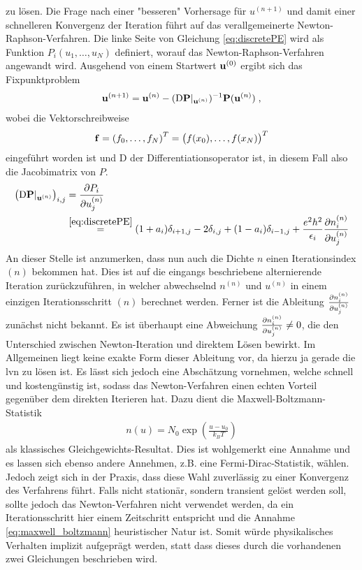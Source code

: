 zu lösen. Die Frage nach einer "besseren" Vorhersage für $u^{(n+1)}$ und damit einer schnelleren Konvergenz der Iteration führt auf das verallgemeinerte Newton-Raphson-Verfahren.
Die linke Seite von Gleichung \eqref{eq:discretePE} wird als Funktion $P_i(u_1,\dots,u_N)$ definiert, worauf das Newton-Raphson-Verfahren angewandt wird. Ausgehend von einem Startwert $\vb{u}^{(0)}$ ergibt sich das Fixpunktproblem
\begin{align}
  \vb{u}^{(n+1)} = \vb{u}^{(n)} - (\mathrm{D}\vb{P}|_{\vb{u}^{(n)}})^{-1} \vb{P}(\vb{u}^{(n)}) \; ,
  \label{eq:fixpunkt_gummel}
\end{align}
wobei die Vektorschreibweise
\begin{align*}
  \vb{f} = \left( f_0,\dots,f_N\right)^T = \left( f(x_0),\dots,f(x_N)\right)^T
\end{align*}
eingeführt worden ist und $\mathrm{D}$ der Differentiationsoperator ist, in diesem Fall also die Jacobimatrix von $P$.
\begin{align*}
  \left(\mathrm{D}\vb{P}|_{\vb{u}^{(n)}}\right)_{i,j} &= \frac{\mathrm{\partial}P_i}{\mathrm{\partial}u_j^{(n)}} \\ &\stackrel{\eqref{eq:discretePE}}{=}
  (1+a_i)\delta_{i+1,j} - 2 \delta_{i,j} + (1-a_i)\delta_{i-1,j} + \frac{e^2h^2}{\epsilon_i}\frac{\mathrm{\partial}n_i^{(n)}}{\mathrm{\partial}u_j^{(n)}}
\end{align*}
An dieser Stelle ist anzumerken, dass nun auch die Dichte $n$ einen Iterationsindex $(n)$ bekommen hat. Dies ist auf die eingangs beschriebene alternierende Iteration zurückzuführen, in welcher abwechselnd $n^{(n)}$ und $u^{(n)}$ in einem einzigen Iterationsschritt $(n)$ berechnet werden. Ferner ist die Ableitung $\frac{\mathrm{\partial}n_i^{(n)}}{\mathrm{\partial}u_j^{(n)}}$ zunächst nicht bekannt.
Es ist überhaupt eine Abweichung $\frac{\mathrm{\partial}n_i^{(n)}}{\mathrm{\partial}u_j^{(n)}} \neq 0$, die den Unterschied zwischen Newton-Iteration und direktem Lösen bewirkt. Im Allgemeinen liegt keine exakte Form dieser Ableitung vor, da hierzu ja gerade die \ac{lvn} zu lösen ist. Es lässt sich jedoch eine Abschätzung vornehmen, welche schnell und kostengünstig ist, sodass das Newton-Verfahren einen echten Vorteil gegenüber dem direkten Iterieren hat. Dazu dient die Maxwell-Boltzmann-Statistik
\begin{align}
  n(u) = N_0\exp\left(\frac{u-u_0}{k_B T}\right)
  \label{eq:maxwell_boltzmann}
\end{align}
als klassisches Gleichgewichts-Resultat. Dies ist wohlgemerkt eine Annahme und es lassen sich ebenso andere Annehmen, z.B. eine Fermi-Dirac-Statistik, wählen. Jedoch zeigt sich in der Praxis, dass diese Wahl zuverlässig zu einer Konvergenz des Verfahrens führt. Falls nicht stationär, sondern transient gelöst werden soll, sollte jedoch das Newton-Verfahren nicht verwendet werden, da ein Iterationsschritt hier einem Zeitschritt entspricht und die Annahme \eqref{eq:maxwell_boltzmann} heuristischer Natur ist. Somit würde physikalisches Verhalten implizit aufgeprägt werden, statt dass dieses durch die vorhandenen zwei Gleichungen beschrieben wird.

